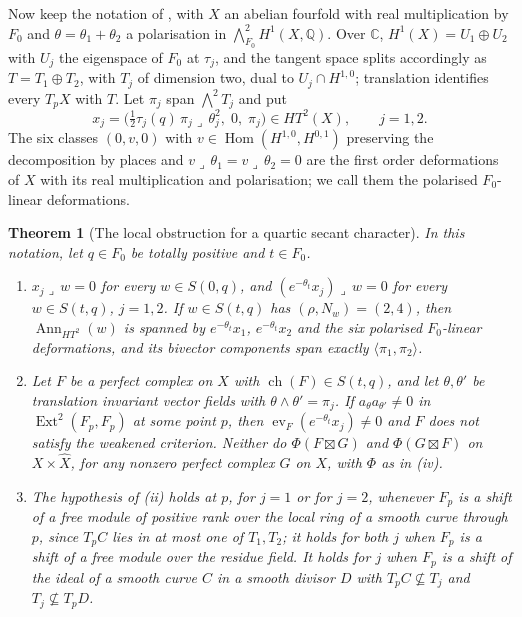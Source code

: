 \documentclass[11pt,reqno]{amsart}
\theoremstyle{plain}
\newtheorem{theorem}{Theorem}[section]
\theoremstyle{definition}
\theoremstyle{remark}
\newcommand{\QQ}{\mathbb{Q}}
\newcommand{\CC}{\mathbb{C}}
\DeclareMathOperator{\ch}{ch}
\DeclareMathOperator{\Hom}{Hom}
\DeclareMathOperator{\Ext}{Ext}
\DeclareMathOperator{\Ann}{Ann}
\begin{document}
Now keep the notation of , with $X$ an abelian
fourfold with real multiplication by $F_{0}$ and $\theta=\theta_{1}+\theta_{2}$
a polarisation in $\bigwedge^{2}_{F_{0}}H^{1}(X,\QQ)$. Over $\CC$,
$H^{1}(X)=U_{1}\oplus U_{2}$ with $U_{j}$ the eigenspace of $F_{0}$ at
$\tau_{j}$, and the tangent space splits accordingly as $T=T_{1}\oplus T_{2}$,
with $T_{j}$ of dimension two, dual to $U_{j}\cap H^{1,0}$; translation
identifies every $T_{p}X$ with $T$. Let $\pi_{j}$ span $\bigwedge^{2}T_{j}$
and put
\begin{equation}\label{eq:quarticcompensated}
  x_{j}=\bigl(\tfrac12\tau_{j}(q)\,\pi_{j}\lrcorner\,\theta_{j}^{2},\;0,\;\pi_{j}\bigr)
  \in HT^{2}(X),\qquad j=1,2.
\end{equation}
The six classes $(0,v,0)$ with $v\in\Hom(H^{1,0},H^{0,1})$ preserving the
decomposition by places and $v\lrcorner\,\theta_{1}=v\lrcorner\,\theta_{2}=0$
are the first order deformations of $X$ with its real multiplication and
polarisation; we call them the polarised $F_{0}$-linear deformations.

\begin{theorem}[The local obstruction for a quartic secant character]
\label{thm:quarticlocal}
In this notation, let $q\in F_{0}$ be totally positive and $t\in F_{0}$.
\begin{enumerate}[label=\textup{(\roman*)},leftmargin=2.6em,itemsep=2pt]
\item $x_{j}\lrcorner\,w=0$ for every $w\in S(0,q)$, and
  $(e^{-\theta_{t}}x_{j})\lrcorner\,w=0$ for every $w\in S(t,q)$, $j=1,2$. If
  $w\in S(t,q)$ has $(\rho,N_{w})=(2,4)$, then $\Ann_{HT^{2}}(w)$ is spanned
  by $e^{-\theta_{t}}x_{1}$, $e^{-\theta_{t}}x_{2}$ and the six polarised
  $F_{0}$-linear deformations, and its bivector components span exactly
  $\langle\pi_{1},\pi_{2}\rangle$.
\item Let $F$ be a perfect complex on $X$ with $\ch(F)\in S(t,q)$, and let
  $\theta,\theta'$ be translation invariant vector fields with
  $\theta\wedge\theta'=\pi_{j}$. If $a_{\theta}a_{\theta'}\ne0$ in
  $\Ext^{2}(F_{p},F_{p})$ at some point $p$, then
  $\operatorname{ev}_{F}(e^{-\theta_{t}}x_{j})\ne0$ and $F$ does not satisfy the
  weakened criterion. Neither do $\Phi(F\boxtimes G)$ and $\Phi(G\boxtimes F)$
  on $X\times\widehat X$, for any nonzero perfect complex $G$ on $X$, with
  $\Phi$ as in (iv).
\item The hypothesis of \textup{(ii)} holds at $p$, for $j=1$ or for $j=2$,
  whenever $F_{p}$ is a shift of a free module of positive rank over the
  local ring of a smooth curve through $p$, since $T_{p}C$ lies in at most one
  of $T_{1},T_{2}$; it holds for both $j$ when $F_{p}$ is a shift of a free
  module over the residue field. It holds for $j$ when $F_{p}$ is a shift of
  the ideal of a smooth curve $C$ in a smooth divisor $D$ with
  $T_{p}C\not\subseteq T_{j}$ and $T_{j}\not\subseteq T_{p}D$.
\end{enumerate}
\end{theorem}
\end{document}
